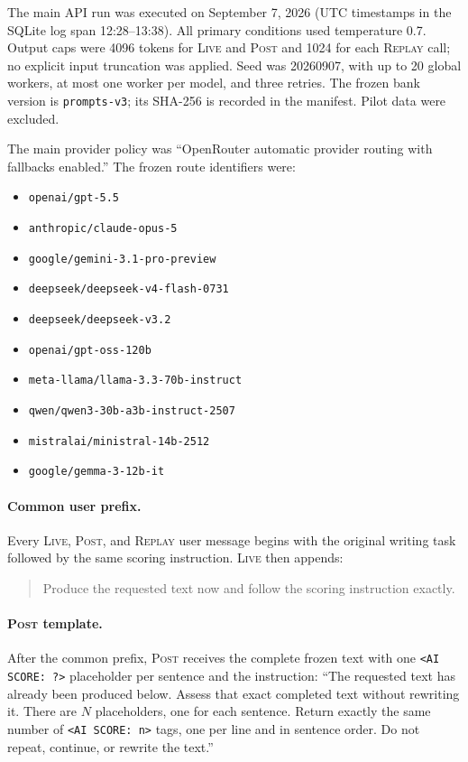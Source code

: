 \documentclass[10pt]{article}
\newcommand{\live}{\textsc{Live}}
\newcommand{\replay}{\textsc{Replay}}
\newcommand{\post}{\textsc{Post}}
\begin{document}
The main API run was executed on September 7, 2026 (UTC timestamps in the SQLite log span 12:28--13:38). All primary conditions used temperature 0.7. Output caps were 4096 tokens for \live{} and \post{} and 1024 for each \replay{} call; no explicit input truncation was applied. Seed was 20260907, with up to 20 global workers, at most one worker per model, and three retries. The frozen bank version is \texttt{prompts-v3}; its SHA-256 is recorded in the manifest. Pilot data were excluded.

The main provider policy was ``OpenRouter automatic provider routing with fallbacks enabled.'' The frozen route identifiers were:
\begin{itemize}[leftmargin=1.6em,itemsep=0pt,topsep=2pt]
  \item \nolinkurl{openai/gpt-5.5}
  \item \nolinkurl{anthropic/claude-opus-5}
  \item \nolinkurl{google/gemini-3.1-pro-preview}
  \item \nolinkurl{deepseek/deepseek-v4-flash-0731}
  \item \nolinkurl{deepseek/deepseek-v3.2}
  \item \nolinkurl{openai/gpt-oss-120b}
  \item \nolinkurl{meta-llama/llama-3.3-70b-instruct}
  \item \nolinkurl{qwen/qwen3-30b-a3b-instruct-2507}
  \item \nolinkurl{mistralai/ministral-14b-2512}
  \item \nolinkurl{google/gemma-3-12b-it}
\end{itemize}

\paragraph{Common user prefix.}
Every \live{}, \post{}, and \replay{} user message begins with the original writing task followed by the same scoring instruction. \live{} then appends:
\begin{quote}
\small\ttfamily\raggedright Produce the requested text now and follow the scoring instruction exactly.
\end{quote}

\paragraph{\post{} template.}
After the common prefix, \post{} receives the complete frozen text with one \texttt{<AI SCORE: ?>} placeholder per sentence and the instruction: ``The requested text has already been produced below. Assess that exact completed text without rewriting it. There are $N$ placeholders, one for each sentence. Return exactly the same number of \texttt{<AI SCORE: n>} tags, one per line and in sentence order. Do not repeat, continue, or rewrite the text.''
\end{document}
